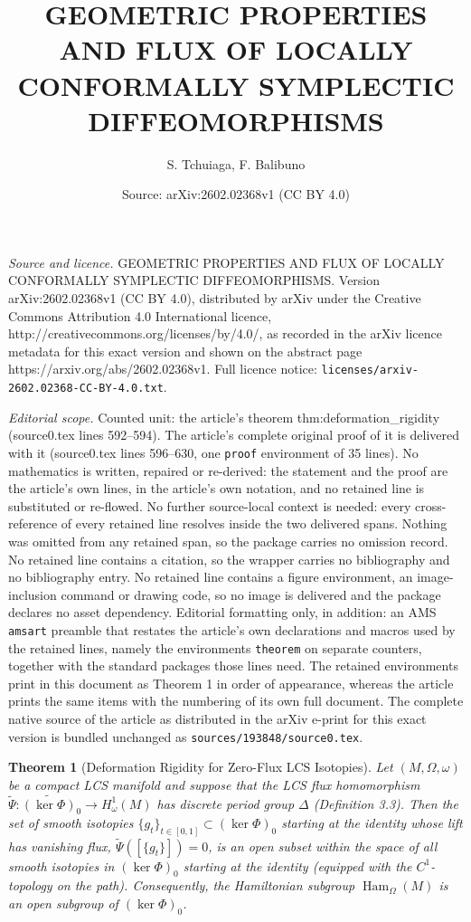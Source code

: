 \documentclass[10pt,a4paper]{amsart}
\title{GEOMETRIC PROPERTIES AND FLUX OF LOCALLY CONFORMALLY SYMPLECTIC DIFFEOMORPHISMS}
\author{S. Tchuiaga, F. Balibuno}
\date{Source: arXiv:2602.02368v1 (CC BY 4.0)}
\newtheorem{theorem}{Theorem}
\newcommand{\Ham}{\operatorname{Ham}}
\begin{document}
\maketitle

\noindent\emph{Source and licence.} GEOMETRIC PROPERTIES AND FLUX OF LOCALLY CONFORMALLY SYMPLECTIC DIFFEOMORPHISMS. Version arXiv:2602.02368v1 (CC BY 4.0), distributed by arXiv under the Creative Commons Attribution 4.0 International licence, http://creativecommons.org/licenses/by/4.0/, as recorded in the arXiv licence metadata for this exact version and shown on the abstract page https://arxiv.org/abs/2602.02368v1. Full licence notice: \texttt{licenses/arxiv-2602.02368-CC-BY-4.0.txt}.\par\smallskip

\noindent\textit{Editorial scope.} Counted unit: the article's theorem thm:deformation\_rigidity (source0.tex lines 592--594). The article's complete original proof of it is delivered with it (source0.tex lines 596--630, one \texttt{proof} environment of 35 lines). No mathematics is written, repaired or re-derived: the statement and the proof are the article's own lines, in the article's own notation, and no retained line is substituted or re-flowed.  No further source-local context is needed: every cross-reference of every retained line resolves inside the two delivered spans.  Nothing was omitted from any retained span, so the package carries no omission record.  No retained line contains a citation, so the wrapper carries no bibliography and no bibliography entry.  No retained line contains a figure environment, an image-inclusion command or drawing code, so no image is delivered and the package declares no asset dependency.  Editorial formatting only, in addition: an AMS \texttt{amsart} preamble that restates the article's own declarations and macros used by the retained lines, namely the environments \texttt{theorem} on separate counters, together with the standard packages those lines need.  The retained environments print in this document as Theorem 1 in order of appearance, whereas the article prints the same items with the numbering of its own full document.  The complete native source of the article as distributed in the arXiv e-print for this exact version is bundled unchanged as \texttt{sources/193848/source0.tex}.
	\begin{theorem}[Deformation Rigidity for Zero-Flux LCS Isotopies] \label{thm:deformation_rigidity}
		Let $(M, \Omega, \omega)$ be a compact LCS manifold and suppose that the LCS flux homomorphism $\widetilde{\Psi} : \widetilde{(\ker \Phi)}_0 \to H_\omega^1(M)$ has discrete period group $\Delta$ (Definition 3.3). Then the set of smooth isotopies $\{g_t\}_{t \in [0,1]} \subset (\ker \Phi)_0$ starting at the identity whose lift has vanishing flux, $\widetilde{\Psi}([\{g_t\}]) = 0$, is an open subset within the space of all smooth isotopies in $(\ker \Phi)_0$ starting at the identity (equipped with the $C^1$-topology on the path). Consequently, the Hamiltonian subgroup $\Ham_\Omega(M)$ is an open subgroup of $(\ker \Phi)_0$.
	\end{theorem}
\end{document}
